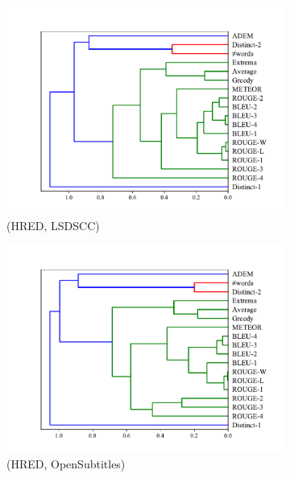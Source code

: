 \begin{figure}[htb]
    \begin{subfigure}{0.40\linewidth}
        \centering
        \includegraphics[width=\linewidth]{figure/plot/hierarchy/v2/pearson/hred/lsdscc/plot.pdf}
        \caption{(HRED, LSDSCC)}
    \end{subfigure}%
    \begin{subfigure}{0.40\linewidth}
        \centering
        \includegraphics[width=\linewidth]{figure/plot/hierarchy/v2/pearson/hred/opensub/plot.pdf}
        \caption{(HRED, OpenSubtitles)}
    \end{subfigure}%
    \begin{subfigure}{0.40\linewidth}
        \centering

\end{subfigure}
\end{figure}

